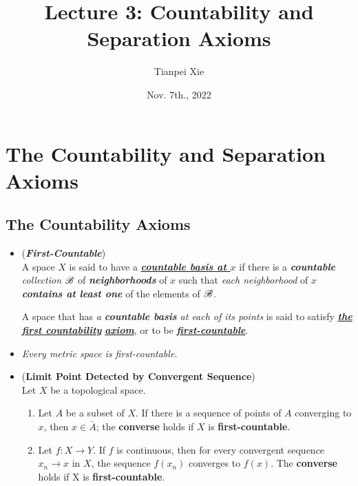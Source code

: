\documentclass[11pt]{article}
\begin{document}
\title{Lecture 3: Countability and Separation Axioms}
\author{ Tianpei Xie}
\date{Nov. 7th., 2022}
\maketitle
\tableofcontents
\newpage
\section{The Countability and Separation Axioms}
\subsection{The Countability Axioms}
\begin{itemize}
\item \begin{definition} (\emph{\textbf{First-Countable}})\\
A space $X$ is said to have a \underline{\emph{\textbf{countable basis at $x$}}} if there is a \emph{\textbf{countable} collection} ${\mathscr B}$ of \emph{\textbf{neighborhoods}} of $x$ such that \emph{each neighborhood} of $x$ \emph{\textbf{contains at least one}} of the elements of ${\mathscr B}$. 

A space that has \emph{a \textbf{countable basis} at each of its points} is said to satisfy \underline{\emph{\textbf{the first countability}}} \underline{\emph{\textbf{axiom}}}, or to be \underline{\emph{\textbf{first-countable}}}.
\end{definition}

\item \begin{remark}
\emph{Every metric space is first-countable.}
\end{remark}

\item \begin{proposition} (\textbf{Limit Point Detected by Convergent Sequence}) \citep{munkres2000topology}\\
Let $X$ be a topological space.
\begin{enumerate}
\item Let $A$ be a subset of $X$. If there is a sequence of points of $A$ converging to $x$, then $x \in \bar{A}$; the \textbf{converse} holds if $X$ is \textbf{first-countable}.
\item Let $f : X \rightarrow Y$. If $f$ is continuous, then for every convergent sequence $x_n \rightarrow x$ in $X$, the sequence $f(x_n)$ converges to $f(x)$. The \textbf{converse} holds if X is \textbf{first-countable}.
\end{enumerate}
\end{proposition}


\end{itemize}
\end{document}
